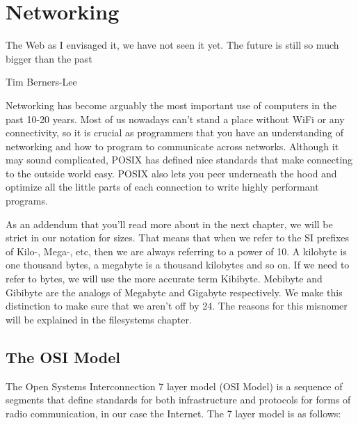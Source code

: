 \chapter{Networking}

\epigraph{The Web as I envisaged it, we have not seen it yet.
  The future is still so much bigger than the past}{Tim Berners-Lee}

Networking has become arguably the most important use of computers in the past 10-20 years.
Most of us nowadays can't stand a place without WiFi or any connectivity, so it is crucial as programmers that you have an understanding of networking and how to program to communicate across networks.
Although it may sound complicated, POSIX has defined nice standards that make connecting to the outside world easy.
POSIX also lets you peer underneath the hood and optimize all the little parts of each connection to write highly performant programs.

As an addendum that you'll read more about in the next chapter, we will be strict in our notation for sizes.
That means that when we refer to the SI prefixes of Kilo-, Mega-, etc, then we are always referring to a power of 10.
A kilobyte is one thousand bytes, a megabyte is a thousand kilobytes and so on.
If we need to refer to  bytes, we will use the more accurate term Kibibyte. Mebibyte and Gibibyte are the analogs of Megabyte and Gigabyte respectively.
We make this distinction to make sure that we aren't off by 24.
The reasons for this misnomer will be explained in the filesystems chapter.

\section{The OSI Model}

The Open Systems Interconnection 7 layer model (OSI Model) is a sequence of segments that define standards for both infrastructure and protocols for forms of radio communication, in our case the Internet.
The 7 layer model is as follows:

